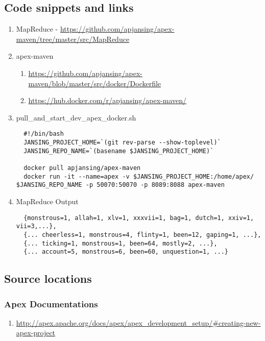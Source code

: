 \documentclass[11 pt]{IEEEtran}
\begin{document}
\subsection{Code snippets and links}
\begin{enumerate}
\item MapReduce - \url{https://github.com/apjansing/apex-maven/tree/master/src/MapReduce}
\item apex-maven 
\begin{enumerate}
  \item \url{https://github.com/apjansing/apex-maven/blob/master/src/docker/Dockerfile}
  \item \url{https://hub.docker.com/r/apjansing/apex-maven/}
\end{enumerate}

\item pull\_and\_start\_dev\_apex\_docker.sh
\begin{lstlisting}
  #!/bin/bash
  JANSING_PROJECT_HOME=`(git rev-parse --show-toplevel)`
  JANSING_REPO_NAME=`(basename $JANSING_PROJECT_HOME)`
  
  docker pull apjansing/apex-maven
  docker run -it --name=apex -v $JANSING_PROJECT_HOME:/home/apex/ $JANSING_REPO_NAME -p 50070:50070 -p 8089:8088 apex-maven
\end{lstlisting}

 \item MapReduce Output
\begin{lstlisting}
  {monstrous=1, allah=1, xlv=1, xxxvii=1, bag=1, dutch=1, xxiv=1, vii=3,...},
  {... cheerless=1, monstrous=4, flinty=1, been=12, gaping=1, ...},
  {... ticking=1, monstrous=1, been=64, mostly=2, ...},
  {... account=5, monstrous=6, been=60, unquestion=1, ...}
\end{lstlisting}
 \end{enumerate}


 \subsection{Source locations}
 
 \subsubsection{Apex Documentations}
 \begin{enumerate}
 \item[] \url{http://apex.apache.org/docs/apex/apex_development_setup/#creating-new-apex-project}
 \end{enumerate}
\end{document}
